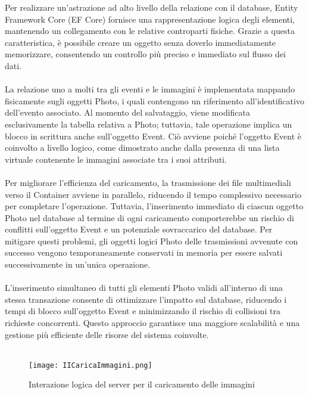Per realizzare un’astrazione ad alto livello della relazione con il database, Entity Framework Core (EF Core) fornisce una rappresentazione logica degli elementi, 
mantenendo un collegamento con le relative controparti fisiche. 
Grazie a questa caratteristica, è possibile creare un oggetto senza doverlo immediatamente memorizzare, consentendo un controllo più preciso e immediato sul flusso dei dati.\\
\\
La relazione uno a molti tra gli eventi e le immagini è implementata mappando fisicamente  sugli oggetti Photo, 
i quali contengono un riferimento all’identificativo dell’evento associato. 
Al momento del salvataggio, viene modificata esclusivamente la tabella relativa a Photo; 
tuttavia, tale operazione implica un blocco in scrittura anche sull’oggetto Event. 
Ciò avviene poiché l’oggetto Event è coinvolto a livello logico, come dimostrato anche dalla presenza di una lista virtuale contenente le immagini associate tra i suoi attributi.\\
\\
Per migliorare l’efficienza del caricamento, la trasmissione dei file multimediali verso il Container avviene in parallelo, 
riducendo il tempo complessivo necessario per completare l’operazione. 
Tuttavia, l’inserimento immediato di ciascun oggetto Photo nel database al termine di ogni caricamento comporterebbe un rischio di conflitti sull’oggetto Event 
e un potenziale sovraccarico del database. Per mitigare questi problemi, 
gli oggetti logici Photo delle trasmissioni avvenute con successo vengono temporaneamente conservati in memoria per essere salvati successivamente  in un’unica operazione.\\
\\
L'inserimento simultaneo di tutti gli elementi Photo validi all'interno di una stessa transazione consente di ottimizzare l’impatto sul database, 
riducendo i tempi di blocco sull’oggetto Event e minimizzando il rischio di collisioni tra richieste concorrenti. 
Questo approccio garantisce una maggiore scalabilità e una gestione più efficiente delle risorse del sistema coinvolte.\\
\\

\begin{figure}[h!]
    \centering
    \texttt{[image: IICaricaImmagini.png]}
    \caption{Interazione logica del server per il caricamento delle immagini }
\end{figure}

\clearpage